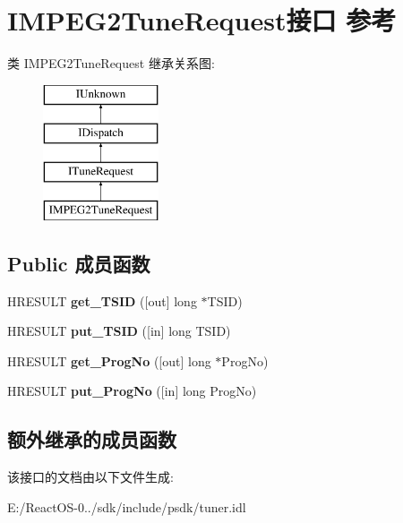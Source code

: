 \hypertarget{interface_i_m_p_e_g2_tune_request}{}\section{I\+M\+P\+E\+G2\+Tune\+Request接口 参考}
\label{interface_i_m_p_e_g2_tune_request}
类 I\+M\+P\+E\+G2\+Tune\+Request 继承关系图\+:\begin{figure}[H]
\begin{center}
\leavevmode
\includegraphics[height=4.000000cm]{interface_i_m_p_e_g2_tune_request}
\end{center}
\end{figure}
\subsection*{Public 成员函数}
\begin{DoxyCompactItemize}
\item 
\mbox{\label{interface_i_m_p_e_g2_tune_request_a324dbdff097dde60c48225434306441e}} 
H\+R\+E\+S\+U\+LT {\bfseries get\+\_\+\+T\+S\+ID} (\mbox{[}out\mbox{]} long $\ast$T\+S\+ID)
\item 
\mbox{\label{interface_i_m_p_e_g2_tune_request_a9b41ebbe5aab48626ae4bef91279bc0d}} 
H\+R\+E\+S\+U\+LT {\bfseries put\+\_\+\+T\+S\+ID} (\mbox{[}in\mbox{]} long T\+S\+ID)
\item 
\mbox{\label{interface_i_m_p_e_g2_tune_request_a1fb466a148892b123cbaa95fc942a797}} 
H\+R\+E\+S\+U\+LT {\bfseries get\+\_\+\+Prog\+No} (\mbox{[}out\mbox{]} long $\ast$Prog\+No)
\item 
\mbox{\label{interface_i_m_p_e_g2_tune_request_ad87a1790b6b68e6652c291b114ba4e52}} 
H\+R\+E\+S\+U\+LT {\bfseries put\+\_\+\+Prog\+No} (\mbox{[}in\mbox{]} long Prog\+No)
\end{DoxyCompactItemize}
\subsection*{额外继承的成员函数}


该接口的文档由以下文件生成\+:\begin{DoxyCompactItemize}
\item 
E\+:/\+React\+O\+S-\/0../sdk/include/psdk/tuner.\+idl\end{DoxyCompactItemize}
